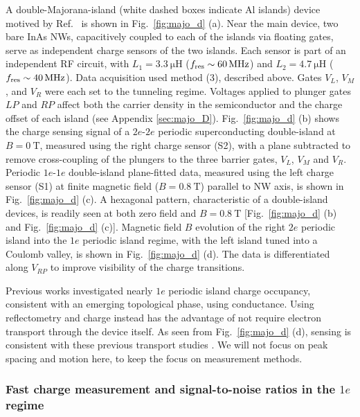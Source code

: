A double-Majorana-island (white dashed boxes indicate Al islands) device motived by Ref.~\cite{AasenPRX16} is shown in Fig.~\ref{fig:majo_d} (a). Near the main device, two bare InAs NWs, capacitively coupled to each of the islands via floating gates, serve as independent charge sensors of the two islands. Each sensor is part of an independent RF circuit, with $L_{1} = \SI{3.3}{\micro\henry}$ ($f_{\rm res} \sim \SI{60}{\mega\hertz}$) and $L_{2} = \SI{4.7}{\micro\henry}$ ($f_{\rm res} \sim \SI{40}{\mega\hertz}$). Data acquisition used method (3), described above. Gates $V_{L}$, $V_{M}$, and $V_{R}$ were each set to the tunneling regime. Voltages applied to plunger gates $LP$ and $RP$ affect both the carrier density in the semiconductor and the charge offset of each island (see Appendix \ref{sec:majo_D}). Fig.~\ref{fig:majo_d} (b) shows the charge sensing signal of a $2e$-$2e$ periodic superconducting double-island at $B = \SI{0}{\tesla}$, measured using the right charge sensor (S2), with a plane subtracted to remove cross-coupling of the plungers to the three barrier gates, $V_{L}$, $V_{M}$ and $V_{R}$.  Periodic $1e$-$1e$ double-island plane-fitted data, measured using the left charge sensor (S1) at finite magnetic field ($B = \SI{0.8}{\tesla}$) parallel to NW axis, is shown in Fig.~\ref{fig:majo_d} (c). A hexagonal pattern, characteristic of a double-island devices, is readily seen at both zero field and $B = \SI{0.8}{\tesla}$  [Fig.~\ref{fig:majo_d} (b) and Fig.~\ref{fig:majo_d} (c)]. Magnetic field $B$ evolution of the right $2e$ periodic island into the $1e$ periodic island regime, with the left island tuned into a Coulomb valley, is shown in Fig.~\ref{fig:majo_d} (d). The data is differentiated along $V_{RP}$ to improve visibility of the charge transitions.

Previous works \cite{AlbrechtNature,sherman} investigated nearly $1e$ periodic island charge occupancy, consistent with an emerging topological phase, using conductance. Using reflectometry and charge instead has  the advantage of not require electron transport through the  device itself. As seen from Fig.~\ref{fig:majo_d} (d), sensing is consistent with these previous transport studies \cite{AlbrechtNature}. We will not focus on peak spacing and motion here, to keep the focus on measurement methods.

\subsubsection{Fast charge measurement and signal-to-noise ratios in the \texorpdfstring{$1e$}{1e} regime}

